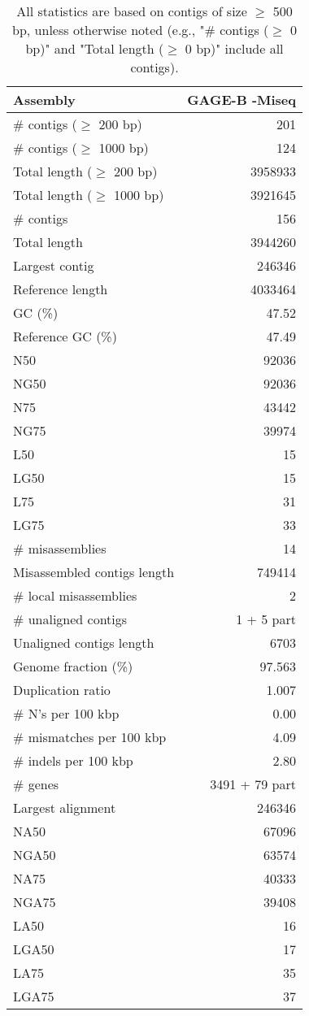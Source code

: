 \documentclass[12pt,a4paper]{article}
\begin{document}
\begin{table}[ht]
\begin{center}
\caption{All statistics are based on contigs of size $\geq$ 500 bp, unless otherwise noted (e.g., "\# contigs ($\geq$ 0 bp)" and "Total length ($\geq$ 0 bp)" include all contigs).}
\begin{tabular}{|l*{1}{|r}|}
\hline
Assembly & GAGE-B -Miseq \\ \hline
\# contigs ($\geq$ 200 bp) & 201 \\ \hline
\# contigs ($\geq$ 1000 bp) & 124 \\ \hline
Total length ($\geq$ 200 bp) & 3958933 \\ \hline
Total length ($\geq$ 1000 bp) & 3921645 \\ \hline
\# contigs & 156 \\ \hline
Total length & 3944260 \\ \hline
Largest contig & 246346 \\ \hline
Reference length & 4033464 \\ \hline
GC (\%) & 47.52 \\ \hline
Reference GC (\%) & 47.49 \\ \hline
N50 & 92036 \\ \hline
NG50 & 92036 \\ \hline
N75 & 43442 \\ \hline
NG75 & 39974 \\ \hline
L50 & 15 \\ \hline
LG50 & 15 \\ \hline
L75 & 31 \\ \hline
LG75 & 33 \\ \hline
\# misassemblies & 14 \\ \hline
Misassembled contigs length & 749414 \\ \hline
\# local misassemblies & 2 \\ \hline
\# unaligned contigs & 1 + 5 part \\ \hline
Unaligned contigs length & 6703 \\ \hline
Genome fraction (\%) & 97.563 \\ \hline
Duplication ratio & 1.007 \\ \hline
\# N's per 100 kbp & 0.00 \\ \hline
\# mismatches per 100 kbp & 4.09 \\ \hline
\# indels per 100 kbp & 2.80 \\ \hline
\# genes & 3491 + 79 part \\ \hline
Largest alignment & 246346 \\ \hline
NA50 & 67096 \\ \hline
NGA50 & 63574 \\ \hline
NA75 & 40333 \\ \hline
NGA75 & 39408 \\ \hline
LA50 & 16 \\ \hline
LGA50 & 17 \\ \hline
LA75 & 35 \\ \hline
LGA75 & 37 \\ \hline
\end{tabular}
\end{center}
\end{table}
\end{document}
